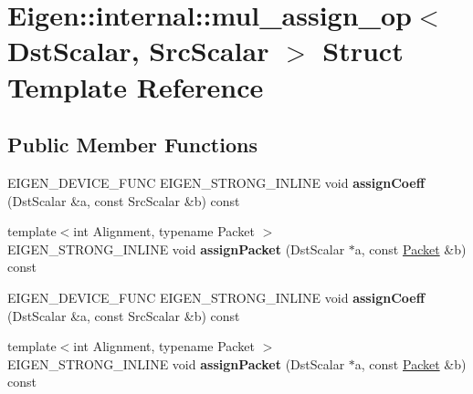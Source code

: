 \hypertarget{struct_eigen_1_1internal_1_1mul__assign__op}{}\section{Eigen\+:\+:internal\+:\+:mul\+\_\+assign\+\_\+op$<$ Dst\+Scalar, Src\+Scalar $>$ Struct Template Reference}
\label{struct_eigen_1_1internal_1_1mul__assign__op}
\subsection*{Public Member Functions}
\begin{DoxyCompactItemize}
\item 
\mbox{\label{struct_eigen_1_1internal_1_1mul__assign__op_acd7bada53be090d217570521d56fddfd}} 
E\+I\+G\+E\+N\+\_\+\+D\+E\+V\+I\+C\+E\+\_\+\+F\+U\+NC E\+I\+G\+E\+N\+\_\+\+S\+T\+R\+O\+N\+G\+\_\+\+I\+N\+L\+I\+NE void {\bfseries assign\+Coeff} (Dst\+Scalar \&a, const Src\+Scalar \&b) const
\item 
\mbox{\label{struct_eigen_1_1internal_1_1mul__assign__op_a3d86808dcbcc709ee0998c6a89320ecb}} 
{\footnotesize template$<$int Alignment, typename Packet $>$ }\\E\+I\+G\+E\+N\+\_\+\+S\+T\+R\+O\+N\+G\+\_\+\+I\+N\+L\+I\+NE void {\bfseries assign\+Packet} (Dst\+Scalar $\ast$a, const \hyperlink{union_eigen_1_1internal_1_1_packet}{Packet} \&b) const
\item 
\mbox{\label{struct_eigen_1_1internal_1_1mul__assign__op_acd7bada53be090d217570521d56fddfd}} 
E\+I\+G\+E\+N\+\_\+\+D\+E\+V\+I\+C\+E\+\_\+\+F\+U\+NC E\+I\+G\+E\+N\+\_\+\+S\+T\+R\+O\+N\+G\+\_\+\+I\+N\+L\+I\+NE void {\bfseries assign\+Coeff} (Dst\+Scalar \&a, const Src\+Scalar \&b) const
\item 
\mbox{\label{struct_eigen_1_1internal_1_1mul__assign__op_a3d86808dcbcc709ee0998c6a89320ecb}} 
{\footnotesize template$<$int Alignment, typename Packet $>$ }\\E\+I\+G\+E\+N\+\_\+\+S\+T\+R\+O\+N\+G\+\_\+\+I\+N\+L\+I\+NE void {\bfseries assign\+Packet} (Dst\+Scalar $\ast$a, const \hyperlink{union_eigen_1_1internal_1_1_packet}{Packet} \&b) const
\end{DoxyCompactItemize}


